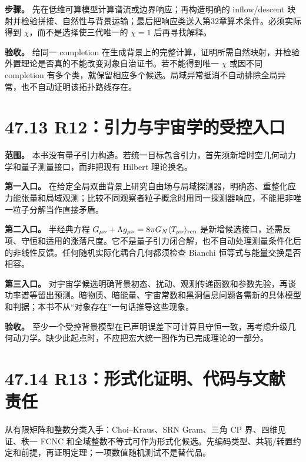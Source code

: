 \documentclass[
  11pt,
  oneside]{book}
\begin{document}
\textbf{步骤。} 先在低维可算模型计算谱流或边界响应；再构造明确的
inflow/descent
映射并检验拼接、自然性与背景运输；最后把响应类送入第32章算术条件。必须实际得到
\(\chi\)，而不是选择使三代唯一的 \(\chi=1\) 后再寻找解释。

\textbf{验收。} 给同一 completion
在生成背景上的完整计算，证明所需自然映射，并检验外置理论是否真的不能改变对象自治证书。若不能得到唯一
\(\chi\) 或因不同 completion
有多个类，就保留相应多个候选。局域异常抵消不自动排除全局异常，也不自动证明该拓扑路线存在。

\hypertarget{r12ux5f15ux529bux4e0eux5b87ux5b99ux5b66ux7684ux53d7ux63a7ux5165ux53e3}{%
\section{47.13
R12：引力与宇宙学的受控入口}\label{r12ux5f15ux529bux4e0eux5b87ux5b99ux5b66ux7684ux53d7ux63a7ux5165ux53e3}}

\textbf{范围。}
本书没有量子引力构造。若统一目标包含引力，首先须新增时空几何动力学和量子测量接口，而非把现有
Hilbert 理论换名。

\textbf{第一入口。}
在给定全局双曲背景上研究自由场与局域探测器，明确态、重整化应力能张量和局域观测；比较不同观察者粒子概念时用同一探测器响应，不能把非唯一粒子分解当作直接矛盾。

\textbf{第二入口。} 半经典方程
\(G_{\mu\nu}+\Lambda g_{\mu\nu}=8\pi G_N\langle T_{\mu\nu}\rangle_{\rm ren}\)
是新增候选接口，还需反项、守恒和适用的涨落尺度。它不是量子引力闭合解，也不自动处理测量条件化后的非线性反馈。任何随机实际化耦合几何都须检查
Bianchi 恒等式与能量交换是否相容。

\textbf{第三入口。}
对宇宙学候选明确背景初态、扰动、观测传递函数和参数先验，再谈功率谱等留出预测。暗物质、暗能量、宇宙常数和黑洞信息问题各需新的具体模型和判据；本书不从``对象存在''一句话推导这些现象。

\textbf{验收。}
至少一个受控背景模型在已声明误差下可计算且守恒一致，再考虑升级几何动力学。缺少此起点时，不应把宏大统一图作为已完成理论的一部分。

\hypertarget{r13ux5f62ux5f0fux5316ux8bc1ux660eux4ee3ux7801ux4e0eux6587ux732eux8d23ux4efb}{%
\section{47.14
R13：形式化证明、代码与文献责任}\label{r13ux5f62ux5f0fux5316ux8bc1ux660eux4ee3ux7801ux4e0eux6587ux732eux8d23ux4efb}}

从有限矩阵和整数分类入手：Choi--Kraus、SRN Gram、三角 CP
界、四维见证、秩一 FCNC
和全域整数不等式可作为形式化候选。先编码类型、共轭/转置约定和前提，再证明定理；一项数值随机测试不是替代品。
\end{document}
